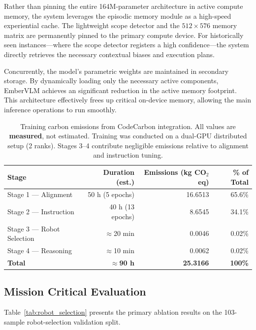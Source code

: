\documentclass[runningheads]{llncs}
\begin{document}
Rather than pinning the entire 164M-parameter architecture in active compute memory, the system leverages the episodic memory module as a high-speed experiential cache. The lightweight scope detector and the $512 \times 576$ memory matrix are permanently pinned to the primary compute device. For historically seen instances—where the scope detector registers a high confidence—the system directly retrieves the necessary contextual biases and execution plans. 

Concurrently, the model's parametric weights are maintained in secondary storage. By dynamically loading only the necessary active components, EmberVLM achieves an significant reduction in the active memory footprint. This architecture effectively frees up critical on-device memory, allowing the main inference operations to run smoothly.

\begin{table}[t]
\centering
\caption{Training carbon emissions from CodeCarbon integration. All values are \textbf{measured}, not estimated. Training was conducted on a dual-GPU distributed setup (2 ranks). Stages 3--4 contribute negligible emissions relative to alignment and instruction tuning.}
\label{tab:emissions}
\begin{tabular}{lrrr}
\toprule
\textbf{Stage} & \textbf{Duration (est.)} & \textbf{Emissions (kg CO$_2$eq)} & \textbf{\% of Total} \\
\midrule
Stage 1 --- Alignment       & 50 h (5 epochs)   & 16.6513 & 65.6\% \\
Stage 2 --- Instruction     & 40 h (13 epochs)  & 8.6545  & 34.1\% \\
Stage 3 --- Robot Selection & $\approx$20 min   & 0.0046  & 0.02\% \\
Stage 4 --- Reasoning       & $\approx$10 min   & 0.0062  & 0.02\% \\
\midrule
\textbf{Total}             & \textbf{$\approx$90 h} & \textbf{25.3166} & \textbf{100\%} \\
\bottomrule
\end{tabular}
\end{table}
\subsection{Mission Critical Evaluation}

Table~\ref{tab:robot_selection} presents the primary ablation results on the 103-sample robot-selection validation split.
\end{document}
